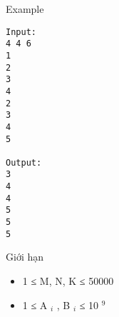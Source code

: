 Example
\begin{verbatim}
Input:
4 4 6
1
2
3
4
2
3
4
5

Output:
3
4
4
5
5
5
\end{verbatim}
Giới hạn
\begin{itemize}
	\item     1 ≤ M, N, K ≤ 50000   
	\item     1 ≤ A    $_     i    $    , B    $_     i    $    ≤ 10    $^     9    $
\end{itemize}